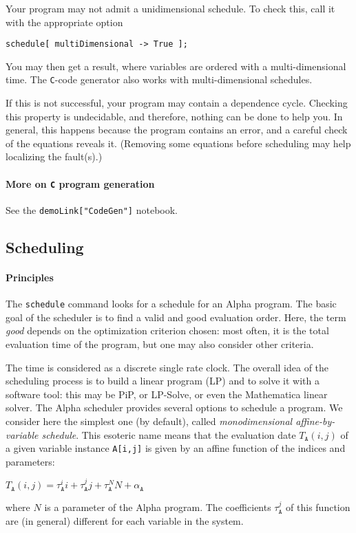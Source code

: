 \documentclass[12pt]{article}
\newcommand{\C}{\texttt{C}}
\newcommand{\pip}{PiP}
\newcommand{\lpsolve}{LP-Solve}
\newcommand{\Alpha}{{\sc Alpha}}
\newcommand{\alfa}{\Alpha}
\newcommand{\mma}{{Mathematica}}
\begin{document}
Your program may not admit a unidimensional schedule. 
To check this, call it with the appropriate option 
\begin{verbatim}
schedule[ multiDimensional -> True ];
\end{verbatim}
You may then get a result, where variables are ordered
with a multi-dimensional time. The \C{}-code generator
also works with multi-dimensional schedules. 

If this is not successful, 
your program may contain a dependence cycle. 
Checking this property is undecidable, and therefore, 
nothing can be done to help you. In general, this happens
because the program contains an error, and a careful check 
of the equations reveals it. (Removing some equations before
scheduling may help 
localizing the fault(s).)

\paragraph*{More on \C{} program generation}
See the \texttt{demoLink["CodeGen"]} notebook. 
\subsection{Scheduling}
\label{schedule}

\paragraph*{Principles}
The {\tt schedule} command looks for a schedule for an {\Alpha}
program.  The basic goal of the scheduler is to find a valid and good
evaluation order. Here, the term {\em good} depends on the
optimization criterion chosen: most often, it is the total evaluation
time of the program, but one may also consider other criteria.

The time is considered as a discrete single rate clock. The overall
idea of the scheduling process is to build a linear program
(LP) and to solve it with a software tool: 
this may be \pip{}\cite{FeautrierTa90}, or \lpsolve{}, or even the \mma{}
linear solver. 
\index{Pip@\pip{}}
\index{LPSolve@\lpsolve{}}
The \alfa{} scheduler provides several options to schedule 
a program. We consider here 
the simplest one (by default), called 
{\em  monodimensional affine-by-variable schedule}. 
This esoteric name means 
that the evaluation date $T_{\texttt{A}}(i,j)$ of a given variable
instance 
\texttt{A[i,j]}  
is given by an affine
function of the indices and parameters:\\
\centerline{ $T_{{\texttt{A}}}(i,j) =
\tau^i_{{\texttt{A}}} i + \tau^j_{{\texttt{A}}} j+ \tau^N_{{\texttt{A}}} N +
\alpha_{{\texttt{A}}}$} where $N$ is a 
parameter of the {\Alpha} program.
The coefficients $\tau^j_{{\texttt{A}}}$ of this function
are (in general) different for each variable in the system.
\end{document}
